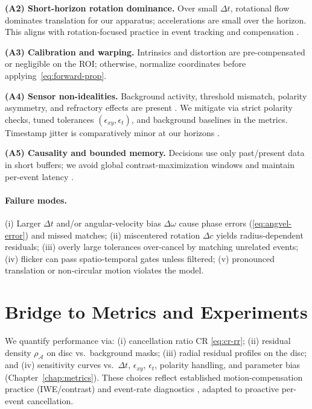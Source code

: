 \textbf{(A2) Short-horizon rotation dominance.} Over small $\Delta t$, rotational flow dominates translation for our apparatus; accelerations are small over the horizon. This aligns with rotation-focused practice in event tracking and compensation \cite{Gallego2017Angular,Gallego2018CMax}.

\textbf{(A3) Calibration and warping.} Intrinsics and distortion are pre-compensated or negligible on the ROI; otherwise, normalize coordinates before applying~\eqref{eq:forward-prop}.

\textbf{(A4) Sensor non-idealities.} Background activity, threshold mismatch, polarity asymmetry, and refractory effects are present \cite{Brandli2014DAVIS,Delbruck2020Handbook,Gallego2020Survey}. We mitigate via strict polarity checks, tuned tolerances $(\epsilon_{xy},\epsilon_t)$, and background baselines in the metrics. Timestamp jitter is comparatively minor at our horizons \cite{Wang2025Thesis}.

\textbf{(A5) Causality and bounded memory.} Decisions use only past/present data in short buffers; we avoid global contrast-maximization windows and maintain per-event latency \cite{Bardow2016SOFIE,Gallego2018CMax}.

\paragraph{Failure modes.}
(i) Larger $\Delta t$ and/or angular-velocity bias $\Delta\omega$ cause phase errors (\ref{eq:angvel-error}) and missed matches; (ii) miscentered rotation $\Delta c$ yields radius-dependent residuals; (iii) overly large tolerances over-cancel by matching unrelated events; (iv) flicker can pass spatio-temporal gates unless filtered; (v) pronounced translation or non-circular motion violates the model.

\section{Bridge to Metrics and Experiments}
\label{sec:metrics-bridge}
We quantify performance via: (i) cancellation ratio $\mathrm{CR}$ \eqref{eq:cr-rr}; (ii) residual density $\rho_\mathcal{A}$ on disc vs.\ background masks; (iii) radial residual profiles on the disc; and (iv) sensitivity curves vs.\ $\Delta t$, $\epsilon_{xy}$, $\epsilon_t$, polarity handling, and parameter bias (Chapter~\ref{chap:metrics}). These choices reflect established motion-compensation practice (IWE/contrast) and event-rate diagnostics \cite{Bardow2016SOFIE,Gallego2018CMax,Stoffregen2019Segmentation,Gallego2020Survey}, adapted to proactive per-event cancellation.
